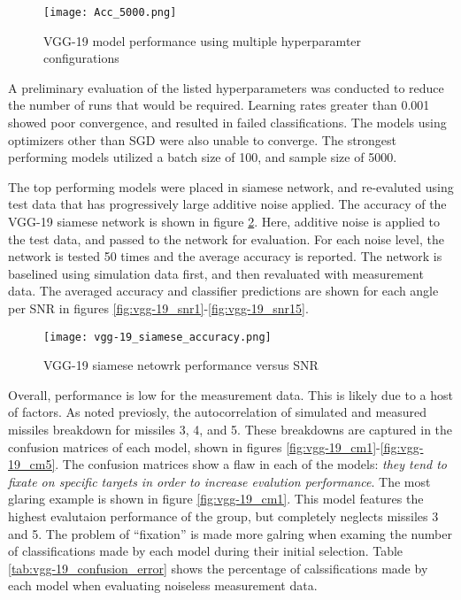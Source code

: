 		\begin{figure}[htbp!]
	    \centering
	    \texttt{[image: Acc\_5000.png]}
	    \caption[VGG-19 Model Testing, and Selection]{VGG-19 model performance using multiple hyperparamter configurations}
	    \label{fig:vgg_19_performance}
	  \end{figure}

		A preliminary evaluation of the listed hyperparameters was conducted to reduce the number of runs that would be required. Learning rates greater than 0.001 showed poor convergence, and resulted in failed classifications. The models using optimizers other than SGD were also unable to converge. The strongest performing models utilized a batch size of 100, and sample size of 5000.

		The top performing models were placed in siamese network, and re-evaluted using test data that has progressively large additive noise applied. The accuracy of the VGG-19 siamese network is shown in figure \ref{fig:vgg-19_siamese_results}. Here, additive noise is applied to the test data, and passed to the network for evaluation. For each noise level, the network is tested 50 times and the average accuracy is reported. The network is baselined using simulation data first, and then revaluated with measurement data. The averaged accuracy and classifier predictions are shown for each angle per SNR in figures \ref{fig:vgg-19_snr1}-\ref{fig:vgg-19_snr15}.

		\begin{figure}[htbp!]
	    \centering
	    \texttt{[image: vgg-19\_siamese\_accuracy.png]}
	    \caption[VGG-19 Siamese Network Performance]{VGG-19 siamese netowrk performance versus SNR}
	    \label{fig:vgg-19_siamese_results}
	  \end{figure}

		Overall, performance is low for the measurement data. This is likely due to a host of factors. As noted previosly, the autocorrelation of simulated and measured missiles breakdown for missiles 3, 4, and 5. These breakdowns are captured in the confusion matrices of each model, shown in figures \ref{fig:vgg-19_cm1}-\ref{fig:vgg-19_cm5}. The confusion matrices show a flaw in each of the models:  \textit{they tend to fixate on specific targets in order to increase evalution performance}. The most glaring example is shown in figure \ref{fig:vgg-19_cm1}. This model features the highest evalutaion performance of the group, but completely neglects missiles 3 and 5. The problem of ``fixation'' is made more galring when examing the number of classifications made by each model during their initial selection. Table \ref{tab:vgg-19_confusion_error} shows the percentage of calssifications made by each model when evaluating noiseless measurement data.

